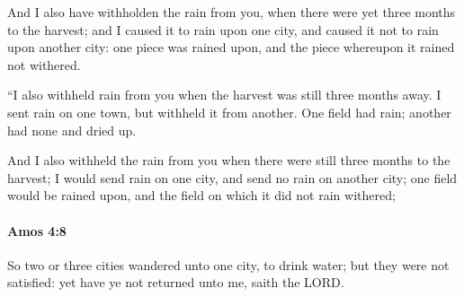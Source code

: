 			\begin{versebox}
					\item[BHS] 
					\item[LXX] 
					\item[ASV] And I also have withholden the rain from you, when there were yet three months to the harvest; and I caused it to rain upon one city, and caused it not to rain upon another city: one piece was rained upon, and the piece whereupon it rained not withered.
					\item[NIV] “I also withheld rain from you when the harvest was still three months away. I sent rain on one town, but withheld it from another. One field had rain; another had none and dried up.
					\item[NRSV] And I also withheld the rain from you when there were still three months to the harvest; I would send rain on one city, and send no rain on another city; one field would be rained upon, and the field on which it did not rain withered;
			\end{versebox}

		\paragraph{Amos 4:8} %
			\label{AMOS-4-8}

			So two or three cities wandered unto one city, to drink water; but they were not satisfied: yet have ye not returned unto me, saith the LORD.

